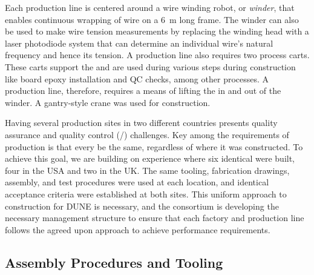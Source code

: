 Each production line is centered around a wire winding robot, or \textit{winder}, that enables continuous wrapping of wire on a \SI{6}{m} long frame. The winder can also be used to make wire tension measurements by replacing the winding head with a laser photodiode system that can determine an individual wire's natural frequency and hence its tension. A production line also requires two process carts. These carts support the  and are used during various steps during construction like board epoxy installation and QC checks, among other processes. A production line, therefore, requires a means of lifting the  in and out of the winder. A gantry-style crane was used for  construction.

Having several  production sites in two different countries presents quality assurance and quality control (/) challenges. Key among the requirements of production is that every  be the same, regardless of where it was constructed. To achieve this goal, we are building on  experience where six identical  were built, four in the USA and two in the UK. The same tooling, fabrication drawings, assembly, and test procedures were used at each location, and identical acceptance criteria were established at both sites.  This uniform approach to construction for DUNE is necessary, and the  consortium is developing the necessary management structure to ensure that each factory and production line follows the agreed upon approach to achieve  performance requirements.


\subsection{Assembly Procedures and Tooling}
\label{sec:fdsp-apa-prod-tooling}

